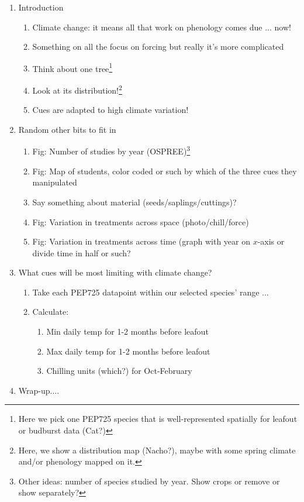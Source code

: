 \documentclass[12pt,letterpaper]{article}
\begin{document}
\begin{enumerate}
\item Introduction 
\begin{enumerate}
\item Climate change: it means all that work on phenology comes due ... now!
\item Something on all the focus on forcing but really it's more complicated
\item Think about one tree\footnote{Here we pick one PEP725 species that is well-represented spatially for leafout or budburst data (Cat?)}
\item Look at its distribution!\footnote{Here, we show a distribution map (Nacho?), maybe with some spring climate and/or phenology mapped on it.}
\item Cues are adapted to high climate variation!
\end{enumerate}
\item Random other bits to fit in
\begin{enumerate}
\item Fig: Number of studies by year (OSPREE)\footnote{Other ideas: number of species studied by year. Show crops or remove or show separately?}
\item Fig: Map of students, color coded or such by which of the three cues they manipulated
\item Say something about material (seeds/saplings/cuttings)?
\item Fig: Variation in treatments across space (photo/chill/force)
\item Fig: Variation in treatments across time (graph with year on $x$-axis or divide time in half or such? 
\end{enumerate}
\item What cues will be most limiting with climate change?
\begin{enumerate}
\item Take each PEP725 datapoint within our selected species' range ... 
\item Calculate: 
\begin{enumerate}
\item Min daily temp for 1-2 months before leafout
\item Max daily temp for 1-2 months before leafout
\item Chilling units (which?) for Oct-February
\end{enumerate}
\end{enumerate}
\item Wrap-up....
\end{enumerate}
\end{document}

